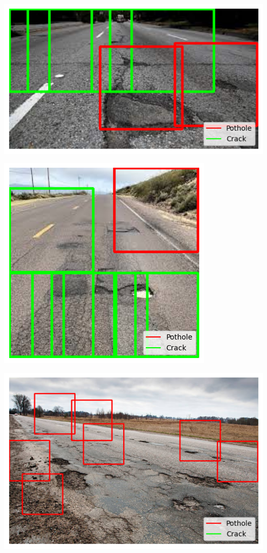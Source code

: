 \documentclass[12pt, letterpaper, twoside]{article}
\begin{document}
\includegraphics{result_2.png}

\includegraphics{result_3.png}

\includegraphics{result_4.png}
\end{document}
